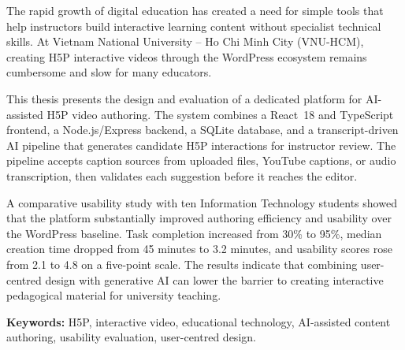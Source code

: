 The rapid growth of digital education has created a need for simple tools that help instructors build interactive learning content without specialist technical skills. At Vietnam National University -- Ho Chi Minh City (VNU-HCM), creating H5P interactive videos through the WordPress ecosystem remains cumbersome and slow for many educators.

This thesis presents the design and evaluation of a dedicated platform for AI-assisted H5P video authoring. The system combines a React~18 and TypeScript frontend, a Node.js/Express backend, a SQLite database, and a transcript-driven AI pipeline that generates candidate H5P interactions for instructor review. The pipeline accepts caption sources from uploaded files, YouTube captions, or audio transcription, then validates each suggestion before it reaches the editor.

A comparative usability study with ten Information Technology students showed that the platform substantially improved authoring efficiency and usability over the WordPress baseline. Task completion increased from 30\% to 95\%, median creation time dropped from 45 minutes to 3.2 minutes, and usability scores rose from 2.1 to 4.8 on a five-point scale. The results indicate that combining user-centred design with generative AI can lower the barrier to creating interactive pedagogical material for university teaching.

\bigskip
\noindent
\textbf{Keywords:} H5P, interactive video, educational technology, AI-assisted content authoring, usability evaluation, user-centred design.

